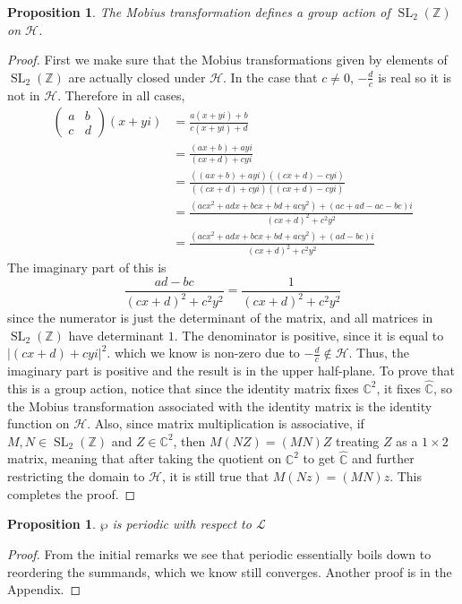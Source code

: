 \documentclass{article}
\newtheorem{proposition}{Proposition}[section]
\newtheorem{prop}{Proposition}[section]
\theoremstyle{definition}
\theoremstyle{definition}
\theoremstyle{definition}
\newcommand{\SLZ}{\operatorname{SL}_2(\mathbb{Z})}
\newcommand{\Mabcd}{\begin{pmatrix} a&b\\c&d \end{pmatrix}}
\begin{document}
\begin{proposition}
    The Mobius transformation defines a group action of $\SLZ$ on $\mathcal{H}$.
\end{proposition}
\begin{proof}
First we make sure that the Mobius transformations given by elements of $\SLZ$ are actually closed under $\mathcal{H}$. In the case that $c\neq0$, $-\frac{d}{c}$ is real so it is not in $\mathcal{H}$. Therefore in all cases,
\begin{align}
  \Mabcd(x+yi)&=\frac{a(x+yi)+b}{c(x+yi)+d}\\
&=\frac{(ax+b)+ayi}{(cx+d)+cyi}\\  
&=\frac{((ax+b)+ayi)((cx+d)-cyi)}{((cx+d)+cyi)((cx+d)-cyi)}\\
&=\frac{(acx^2+adx+bcx+bd+acy^2)+(ac+ad-ac-bc)i}{(cx+d)^2+c^2y^2}\\
&=\frac{(acx^2+adx+bcx+bd+acy^2)+(ad-bc)i}{(cx+d)^2+c^2y^2}
\end{align}
The imaginary part of this is $$\frac{ad-bc}{(cx+d)^2+c^2y^2}=\frac{1}{(cx+d)^2+c^2y^2}$$ since the numerator is just the determinant of the matrix, and all matrices in $\SLZ$ have determinant $1$. The denominator is positive, since it is equal to $|(cx+d)+cyi|^2$. which we know is non-zero due to $-\frac{d}{c}\notin\mathcal{H}$. Thus, the imaginary part is positive and the result is in the upper half-plane.
\newline\newline
To prove that this is a group action, notice that since the identity matrix fixes $\mathbb{C}^2$, it fixes $\hat{\mathbb{C}}$, so the Mobius transformation associated with the identity matrix is the identity function on $\mathcal{H}$. Also, since matrix multiplication is associative, if $M,N\in\SLZ$ and $Z\in\mathbb{C}^2$, then $M(NZ)=(MN)Z$ treating $Z$ as a $1\times2$ matrix, meaning that after taking the quotient on $\mathbb{C}^2$ to get $\hat{\mathbb{C}}$ and further restricting the domain to $\mathcal{H}$, it is still true that $M(Nz)=(MN)z$. This completes the proof.

\end{proof}

\begin{prop}$\wp$ is periodic with respect to $\mathcal L$
\end{prop}
\begin{proof}
    From the initial remarks we see that periodic essentially boils down to reordering the summands, which we know still converges. Another proof is in the Appendix.
\end{proof}
\end{document}
